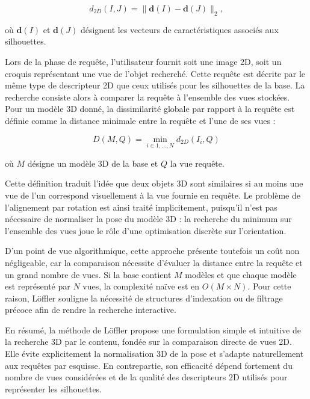 \documentclass[11pt,a4paper,oneside]{report}
\begin{document}
$$
d_{2D}(I,J) = \lVert \mathbf{d}(I) - \mathbf{d}(J) \rVert_2,
$$

où $\mathbf{d}(I)$ et $\mathbf{d}(J)$ désignent les vecteurs de caractéristiques associés aux silhouettes.

Lors de la phase de requête, l’utilisateur fournit soit une image 2D, soit un croquis représentant une vue de l’objet recherché. Cette requête est décrite par le même type de descripteur 2D que ceux utilisés pour les silhouettes de la base. La recherche consiste alors à comparer la requête à l’ensemble des vues stockées. Pour un modèle 3D donné, la dissimilarité globale par rapport à la requête est définie comme la distance minimale entre la requête et l’une de ses vues :

$$
D(M, Q) = \min_{i \in {1,\dots,N}} d_{2D}(I_i, Q)
$$

où $M$ désigne un modèle 3D de la base et $Q$ la vue requête.

Cette définition traduit l’idée que deux objets 3D sont similaires si au moins une vue de l’un correspond visuellement à la vue fournie en requête. Le problème de l’alignement par rotation est ainsi traité implicitement, puisqu’il n’est pas nécessaire de normaliser la pose du modèle 3D : la recherche du minimum sur l’ensemble des vues joue le rôle d’une optimisation discrète sur l’orientation.

D’un point de vue algorithmique, cette approche présente toutefois un coût non négligeable, car la comparaison nécessite d’évaluer la distance entre la requête et un grand nombre de vues. Si la base contient $M$ modèles et que chaque modèle est représenté par $N$ vues, la complexité naïve est en $O(M \times N)$. Pour cette raison, Löffler souligne la nécessité de structures d’indexation ou de filtrage précoce afin de rendre la recherche interactive.

En résumé, la méthode de Löffler propose une formulation simple et intuitive de la recherche 3D par le contenu, fondée sur la comparaison directe de vues 2D. Elle évite explicitement la normalisation 3D de la pose et s’adapte naturellement aux requêtes par esquisse. En contrepartie, son efficacité dépend fortement du nombre de vues considérées et de la qualité des descripteurs 2D utilisés pour représenter les silhouettes.

\subsubsection{~\cite{funkhouser42}}
\end{document}
